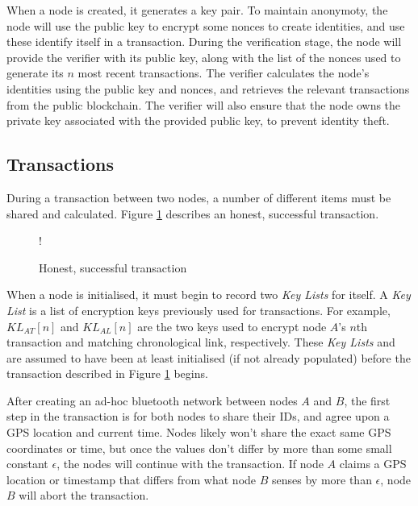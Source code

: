 \documentclass[12pt]{article}
\begin{document}

When a node is created, it generates a key pair. To maintain anonymoty, the node will use the public key to encrypt some nonces to create identities, and use these identify itself in a transaction. During the verification stage, the node will provide the verifier with its public key, along with the list of the nonces used to generate its $n$ most recent transactions. The verifier calculates the node's identities using the public key and nonces, and retrieves the relevant transactions from the public blockchain. The verifier will also ensure that the node owns the private key associated with the provided public key, to prevent identity theft.

\subsection{Transactions}
During a transaction between two nodes, a number of different items must be shared and calculated. Figure \ref{fig:transaction} describes an honest, successful transaction.

\begin{figure}[h]
\resizebox {\columnwidth} {!} {}
\caption{Honest, successful transaction}
\label{fig:transaction}
\end{figure}

When a node is initialised, it must begin to record two \textit{Key Lists} for itself. A \textit{Key List} is a list of encryption keys previously used for transactions. For example, $KL_{AT}[n]$ and $KL_{AL}[n]$ are the two keys used to encrypt node $A$'s $n$th transaction and matching chronological link, respectively. These \textit{Key Lists} and are assumed to have been at least initialised (if not already populated) before the transaction described in Figure \ref{fig:transaction} begins.

After creating an ad-hoc bluetooth network between nodes $A$ and $B$, the first step in the transaction is for both nodes to share their IDs, and agree upon a GPS location and current time. Nodes likely won't share the exact same GPS coordinates or time, but once the values don't differ by more than some small constant $\epsilon$, the nodes will continue with the transaction. If node $A$ claims a GPS location or timestamp that differs from what node $B$ senses by more than $\epsilon$, node $B$ will abort the transaction.
\end{document}
